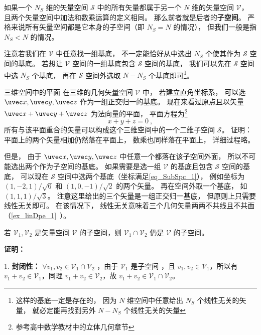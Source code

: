 

如果一个 $N_S$ 维的矢量空间 $\mathcal S$ 中的所有矢量都属于另一个 $N$ 维的矢量空间 $\mathcal V$， 且两个矢量空间中加法和数乘运算的定义相同。 那么前者就是后者的\textbf{子空间}。 严格来说所有矢量空间都是它本身的子空间（即 $N_S = N$ 的情况）， 但我们一般是指 $N_S < N$ 的情况。

注意若我们在 $\mathcal V$ 中任意找一组基底， 不一定能恰好从中选出 $N_S$ 个使其作为 $\mathcal S$ 空间的基底。 若想让 $\mathcal V$ 空间的一组基底包含 $\mathcal S$ 空间的基底， 我们可以先在 $\mathcal S$ 空间中选 $N_S$ 个基底， 再在 $\mathcal S$ 空间外选取 $N - N_S$ 个基底即可\footnote{这样的基底一定是存在的， 因为 $N$ 维空间中任意给出 $N_S$ 个线性无关的矢量， 就必定能再找到另外 $N - N_S$ 个线性无关的矢量}。

\begin{example}{三维空间中的平面}
在三维的几何矢量空间 $\mathcal V$ 中， 若建立直角坐标系， 可以选 $\uvec x, \uvec y, \uvec z$ 作为一组正交归一的基底。 现在来看过原点且以矢量 $\uvec x + \uvec y + \uvec z$ 为法向量的平面， 平面方程为\footnote{参考高中数学教材中的立体几何章节}
\begin{equation}\label{eq_SubSpc_1}
x + y + z = 0~,
\end{equation}
所有与该平面重合的矢量可以构成这个三维空间中的一个二维子空间 $\mathcal S$。 证明： 平面上的两个矢量相加仍然落在平面上， 数乘也同样落在平面上， 详细过程略。 

但是， 由于 $\uvec x, \uvec y, \uvec z$ 中任意一个都落在该子空间外面， 所以不可能选出两个作为子空间的基底。 如果需要是选一组 $\mathcal V$ 的基底且包含 $\mathcal S$ 空间的基底， 可以现在 $\mathcal S$ 空间中选两个基底（坐标满足\autoref{eq_SubSpc_1}）， 例如坐标为 $(1, -2, 1)/\sqrt{6}$ 和 $(1, 0, -1)/\sqrt{2}$ 的两个矢量。 再在空间外取一个基底， 如 $(1, 1, 1)/\sqrt{3}$。 注意这里给出的三个矢量是一组正交归一基底， 但原则上只需要线性无关即可。 在该情况下， 线性无关意味着三个几何矢量两两不共线且不共面（\autoref{ex_linDpe_1}~）。
\end{example}
\begin{theorem}{}\label{the_SubSpc_1}
若 $\mathcal V_1,\mathcal V_2$ 是矢量空间 $\mathcal V$ 的子空间，则 $\mathcal V_1\cap\mathcal V_2$ 仍是 $\mathcal V$ 的子空间。
\end{theorem}
\textbf{证明：}

1. \textbf{封闭性：} $\forall v_1,v_2\in\mathcal V_1\cap\mathcal V_2$ ，由于 $\mathcal V_1$ 是子空间 ，且 $v_1,v_2\in\mathcal V_1$，所以有 $v_1+v_2\in \mathcal V_1$，同理 $v_1+v_2\in \mathcal V_2$，故 $v_1+v_2\in \mathcal V_1\cap\mathcal V_2$。

